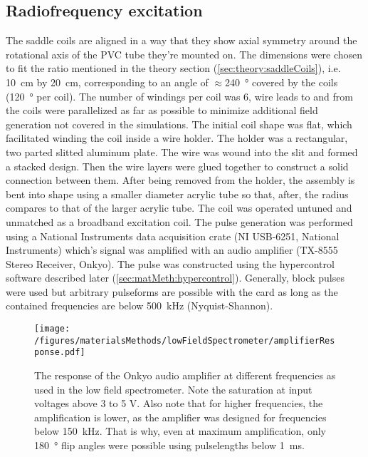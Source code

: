         \subsection{Radiofrequency excitation}
        \label{sec:matMeth:rfPulses}
        The saddle coils are aligned in a way that they show axial symmetry around the rotational axis of the PVC tube they're mounted on. The dimensions were chosen to fit the ratio mentioned in the theory section (\ref{sec:theory:saddleCoils}), i.e. \SI{10}{\cm} by \SI{20}{\cm}, corresponding to an angle of $\approx$\SI{240}{\degree} covered by the coils (\SI{120}{\degree} per coil). The number of windings per coil was 6, wire leads to and from the coils were parallelized as far as possible to minimize additional field generation not covered in the simulations. 
        The initial coil shape was flat, which facilitated winding the coil inside a wire holder. The holder was a rectangular, two parted slitted aluminum plate. The wire was wound into the slit and formed a stacked design. Then the wire layers were glued together to construct a solid connection between them. After being removed from the holder, the assembly is bent into shape using a smaller diameter acrylic tube so that, after, the radius compares to that of the larger acrylic tube. The coil was operated untuned and unmatched as a broadband excitation coil. The pulse generation was performed using a National Instruments data acquisition crate (NI USB-6251, National Instruments) which's signal was amplified with an audio amplifier (TX-8555 Stereo Receiver, Onkyo).
            The pulse was constructed using the hypercontrol software described later (\ref{sec:matMeth:hypercontrol}). Generally, block pulses were used but arbitrary pulseforms are possible with the card as long as the contained frequencies are below \SI{500}{\kilo\hertz} (Nyquist-Shannon). 
            \begin{figure}
                \label{fig:matMeth:amplifierResponse}
                \centering
                \texttt{[image: /figures/materialsMethods/lowFieldSpectrometer/amplifierResponse.pdf]}
            \caption[Amplifier response]{The response of the Onkyo audio amplifier at different frequencies as used in the low field spectrometer. Note the saturation at input voltages above 3 to 5 \si{\volt}. Also note that for higher frequencies, the amplification is lower, as the amplifier was designed for frequencies below \SI{150}{\kilo\hertz}. That is why, even at maximum amplification, only \SI{180}{\degree} flip angles were possible using pulselengths below \SI{1}{\milli\second}.}
            \end{figure}
